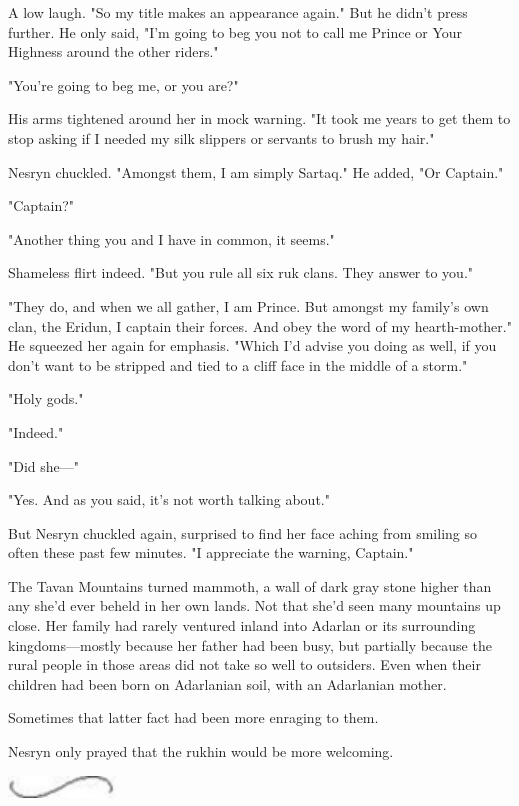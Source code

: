 A low laugh.
"So my title makes an appearance again."
But he didn't press further.
He only said, "I'm going to beg you not to call me Prince or Your Highness around the other riders."

"You're going to beg me, or you are?"

His arms tightened around her in mock warning.
"It took me years to get them to stop asking if I needed my silk slippers or servants to brush my hair."

Nesryn chuckled.
"Amongst them, I am simply Sartaq."
He added, "Or Captain."

"Captain?"

"Another thing you and I have in common, it seems."

Shameless flirt indeed.
"But you rule all six ruk clans.
They answer to you."

"They do, and when we all gather, I am Prince.
But amongst my family's own clan, the Eridun, I captain their forces.
And obey the word of my hearth-mother."
He squeezed her again for emphasis.
"Which I'd advise you doing as well, if you don't want to be stripped and tied to a cliff face in the middle of a storm."

"Holy gods."

"Indeed."

"Did she---"

"Yes.
And as you said, it's not worth talking about."

But Nesryn chuckled again, surprised to find her face aching from smiling so often these past few minutes.
"I appreciate the warning, Captain."

The Tavan Mountains turned mammoth, a wall of dark gray stone higher than any she'd ever beheld in her own lands.
Not that she'd seen many mountains up close.
Her family had rarely ventured inland into Adarlan or its surrounding kingdoms---mostly because her father had been busy, but partially because the rural people in those areas did not take so well to outsiders.
Even when their children had been born on Adarlanian soil, with an Adarlanian mother.

Sometimes that latter fact had been more enraging to them.

Nesryn only prayed that the rukhin would be more welcoming.

\begin{center}
	\includegraphics[width=1.12in,height=0.24in]{images/seperator}
\end{center}


